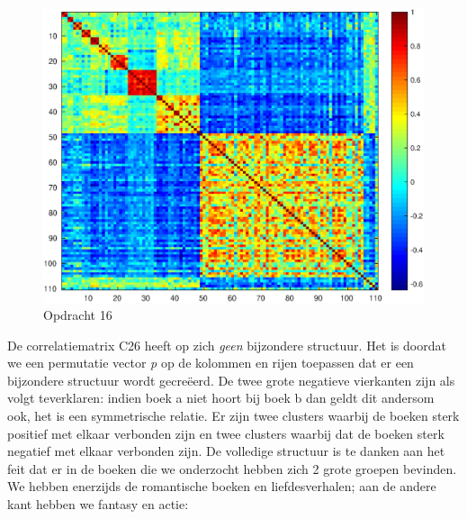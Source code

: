 \documentclass[11pt,a4paper]{article}
\begin{document}
\begin{figure}[H]
\centering
\includegraphics[scale=0.55]{opdracht16}
\caption{Opdracht 16}
\end{figure}
De correlatiematrix C26 heeft op zich \textit{geen} bijzondere structuur. Het is doordat we een permutatie vector \textit{p} op de kolommen en rijen toepassen dat er een bijzondere structuur wordt gecreëerd. De twee grote negatieve vierkanten zijn als volgt teverklaren: indien boek a niet hoort bij boek b dan geldt dit andersom ook, het is een symmetrische relatie. Er zijn twee clusters waarbij de boeken sterk positief met elkaar verbonden zijn en twee clusters waarbij dat de boeken sterk negatief met elkaar verbonden zijn.
De volledige structuur is te danken aan het feit dat er in de boeken die we onderzocht hebben zich 2 grote groepen bevinden. We hebben enerzijds de romantische boeken en liefdesverhalen; aan de andere kant hebben we fantasy en actie:
\end{document}
